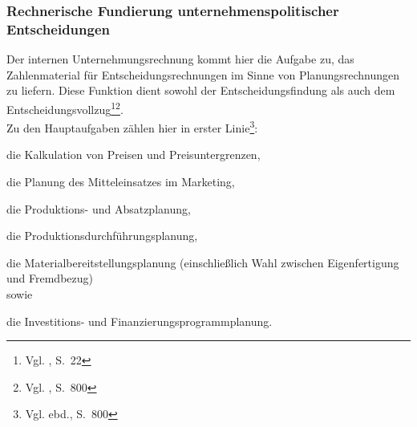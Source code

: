 \subsubsection{Rechnerische Fundierung unternehmenspolitischer Entscheidungen}
Der internen Unternehmungsrechnung kommt hier die Aufgabe zu, das Zahlenmaterial für Entscheidungsrechnungen im Sinne von Planungsrechnungen zu liefern. Diese Funktion dient sowohl der Entscheidungsfindung als auch dem Entscheidungsvollzug\footnote{Vgl. \cite{Klein1999}, S.~22}\footnote{Vgl. \cite{Schierenbeck2008}, S.~800}.\\
Zu den Hauptaufgaben zählen hier in erster Linie\footnote{Vgl. ebd., S.~800}: 
\begin{compactitem}
\item die Kalkulation von Preisen und Preisuntergrenzen, 
\item die Planung des Mitteleinsatzes im Marketing, 
\item die Produktions- und Absatzplanung, 
\item die Produktionsdurchführungsplanung, 
\item die Materialbereitstellungsplanung (einschließlich Wahl zwischen Eigenfertigung und Fremdbezug) \\sowie 
\item die Investitions- und Finanzierungsprogrammplanung. 
\end{compactitem} 





